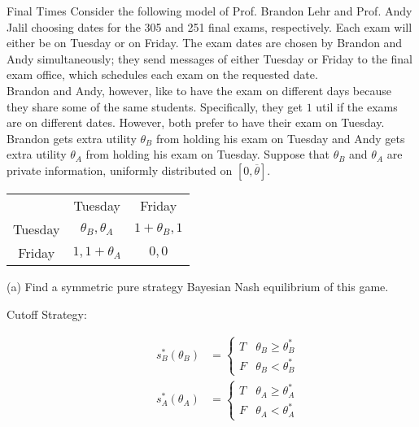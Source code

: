 \documentclass[8pt]{extarticle}
\begin{document}
  \begin{problem}{Final Times}
    Consider the following model of Prof. Brandon Lehr and Prof. Andy Jalil choosing dates for the 305 and 251 final exams, respectively. Each exam will either be on Tuesday or on Friday. The exam dates are chosen by Brandon and Andy simultaneously; they send messages of either Tuesday or Friday to the final exam office, which schedules each exam on the requested date.\\

    Brandon and Andy, however, like to have the exam on different days because they share some of the same students. Specifically, they get $1$ util if the exams are on different dates. However, both prefer to have their exam on Tuesday. Brandon gets extra utility $\theta_B$ from holding his exam on Tuesday and Andy gets extra utility $\theta_A$ from holding his exam on Tuesday. Suppose that $\theta_B$ and $\theta_A$ are private information, uniformly distributed on $[0, \overline{\theta}]$.
    \begin{center}
      \renewcommand{\arraystretch}{1.5}
      \begin{tabular}{c|c|c|}
        \multicolumn{1}{c}{} & \multicolumn{1}{c}{Tuesday} & \multicolumn{1}{c}{Friday}\\
        \cline{2-3}
        Tuesday & $\theta_B,\theta_A$ & $1 + \theta_B,1$\\
        \cline{2-3}
        Friday & $1,1+\theta_A$ & $0,0$\\
        \cline{2-3}
      \end{tabular}
    \end{center}
    \tcblower
    \begin{problem}{(a)}
      Find a symmetric pure strategy Bayesian Nash equilibrium of this game.
      \tcblower
      \begin{description}
        \item[Cutoff Strategy:]
          \begin{align*}
            s_{B}^{\ast}(\theta_B) &= \begin{cases}
              T & \theta_{B} \geq \theta_B^{\ast}\\
              F & \theta_{B} < \theta_{B}^{\ast}
            \end{cases}\\
              s_{A}^{\ast}(\theta_A) &= \begin{cases}
                T & \theta_{A} \geq \theta_{A}^{\ast}\\
                F & \theta_{A} < \theta_{A}^{\ast}

\end{cases}
\end{align*}
\end{description}
\end{problem}
\end{problem}
\end{document}

